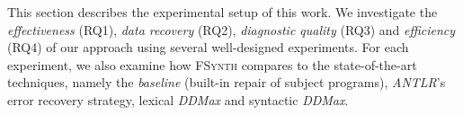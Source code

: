 \documentclass[sigconf,review,anonymous]{acmart}
\newcommand{\approach}{\textsc{FSynth}\xspace}
\newcommand{\ddmax}{\textit{DDMax}\xspace}
\newcommand{\brepair}{\textsc{FSynth}\xspace}
\begin{document}
This section describes the experimental setup of this work.
% 
%
We investigate the \textit{effectiveness} (RQ1), \textit{data recovery} (RQ2), \textit{diagnostic quality} (RQ3) and \textit{efficiency} (RQ4) of our approach using several well-designed experiments. For each experiment, we also examine how \approach compares to the state-of-the-art techniques, namely the \textit{baseline} (built-in repair of subject programs), \textit{ANTLR}'s error recovery strategy, lexical \ddmax and syntactic \ddmax.
\end{document}
